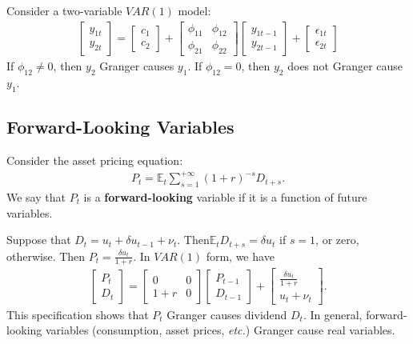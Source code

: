 \documentclass[12pt]{article}
\begin{document}
Consider a two-variable $VAR(1)$ model:
\begin{align*}
    \begin{bmatrix}
        y_{1t}\\
        y_{2t}
    \end{bmatrix}
    =
    \begin{bmatrix}
        c_1\\
        c_2
    \end{bmatrix}
    +
    \begin{bmatrix}
        \phi_{11} & \phi_{12}\\
        \phi_{21} & \phi_{22}
    \end{bmatrix}
    \begin{bmatrix}
        y_{1t-1}\\
        y_{2t-1}
    \end{bmatrix}
    +
    \begin{bmatrix}
        \epsilon_{1t}\\
        \epsilon_{2t}
    \end{bmatrix}
\end{align*}
If $\phi_{12} \neq 0$, then $y_2$ Granger causes $y_1$. If $\phi_{12} = 0$, then $y_2$ does not Granger cause $y_1$.

\subsection{Forward-Looking Variables}
Consider the asset pricing equation:
\begin{align*}
    P_t = \mathbb{E}_t \sum_{s=1}^{+\infty} (1+r)^{-s} D_{t+s}.
\end{align*}
We say that $P_t$ is a \textbf{forward-looking} variable if it is a function of future variables. 

Suppose that $D_t = u_t + \delta u_{t-1} + \nu_t$. Then$\mathbb{E}_t D_{t+s} = \delta u_t$ if $s=1$, or zero, otherwise. Then $P_t = \frac{\delta u_t}{1+r}$. In $VAR(1)$ form, we have
\begin{align*}
    \begin{bmatrix}
        P_{t}\\
        D_{t}
    \end{bmatrix}
    =
    \begin{bmatrix}
        0 & 0\\
        1+r & 0
    \end{bmatrix}
    \begin{bmatrix}
        P_{t-1}\\
        D_{t-1}
    \end{bmatrix}
    +
    \begin{bmatrix}
        \frac{\delta u_t}{1+r}\\
        u_t + \nu_t
    \end{bmatrix}.
\end{align*}
This specification shows that $P_t$ Granger causes dividend $D_t$. In general, forward-looking variables (consumption, asset prices, \textit{etc.}) Granger cause real variables.
\end{document}
